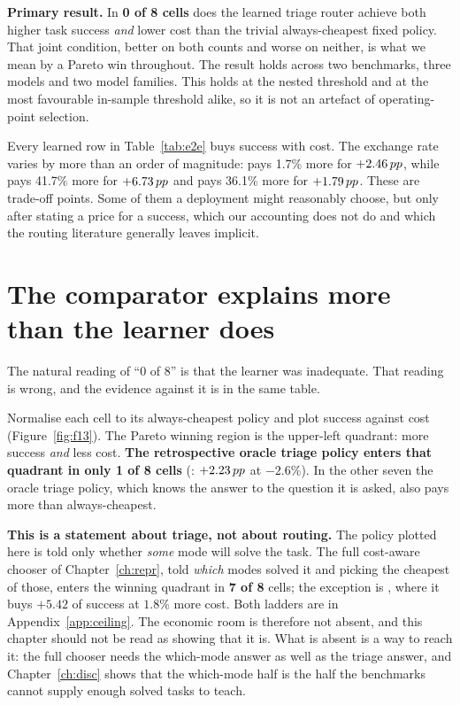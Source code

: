\begin{scopebox}
\textbf{Primary result.} In \textbf{0 of 8 cells} does the learned triage
router achieve both higher task success \emph{and} lower cost than the trivial
always-cheapest fixed policy. That joint condition, better on both counts and
worse on neither, is what we mean by a Pareto win throughout. The result
holds across two benchmarks, three models and two model families. This holds at the nested threshold and
at the most favourable in-sample threshold alike, so it is not an artefact of
operating-point selection.
\end{scopebox}

Every learned row in Table~\ref{tab:e2e} buys success with cost. The exchange
rate varies by more than an order of magnitude:  pays 1.7\%
more for $+2.46\,pp$, while  pays 41.7\% more for
$+6.73\,pp$ and  pays 36.1\% more for $+1.79\,pp$. These are
trade-off points. Some of them a deployment might reasonably choose, but only after stating a price for a success, which our accounting does not do and which
the routing literature generally leaves implicit.

\FloatBarrier
\section{The comparator explains more than the learner does}
\label{sec:comparator-effect}

The natural reading of ``0 of 8'' is that the learner was inadequate. That
reading is wrong, and the evidence against it is in the same table.

Normalise each cell to its always-cheapest policy and plot success against cost
(Figure~\ref{fig:f13}). The Pareto winning region is the upper-left quadrant:
more success \emph{and} less cost. \textbf{The retrospective oracle triage policy
enters that quadrant in only 1 of 8 cells} (: $+2.23\,pp$ at
$-2.6\%$). In the other seven the oracle triage policy, which knows the answer
to the question it is asked, also pays more than always-cheapest.

\begin{scopebox}
\textbf{This is a statement about triage, not about routing.} The policy plotted
here is told only whether \emph{some} mode will solve the task. The full
cost-aware chooser of Chapter~\ref{ch:repr}, told \emph{which} modes solved it
and picking the cheapest of those, enters the winning quadrant in \textbf{7 of
8} cells; the exception is , where it buys $+5.42$\pp{} of
success at $1.8\%$ more cost. Both ladders are in
Appendix~\ref{app:ceiling}. The economic room is therefore not absent, and this
chapter should not be read as showing that it is. What is absent is a way to
reach it: the full chooser needs the which-mode answer as well as the triage
answer, and Chapter~\ref{ch:disc} shows that the which-mode half is the half the
benchmarks cannot supply enough solved tasks to teach.
\end{scopebox}

